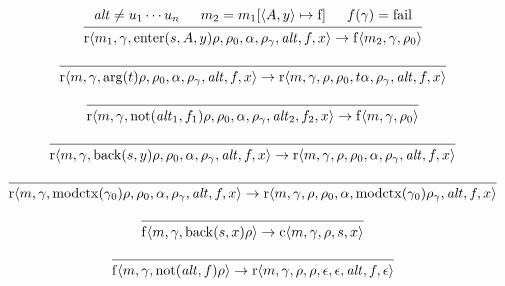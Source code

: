 \documentclass[12pt]{article}
\begin{document}
\[
  \begin{prooftree}
    \hypo{\mathit{alt} \neq u_1 \cdots u_n}
    \hypo{m_2 = m_1[\langle A, y\rangle \mapsto \mathrm{f}]}
    \hypo{f(\gamma) = \mathrm{fail}}
    \infer3{\mathrm{r}\langle m_1, \gamma, \mathrm{enter}(s, A, y) \rho, \rho_0, \alpha, \rho_\gamma, \mathit{alt}, f, x\rangle \to \mathrm{f}\langle m_2, \gamma, \rho_0\rangle}
  \end{prooftree}
\]

\[
  \begin{prooftree}
    \infer0{\mathrm{r}\langle m, \gamma, \mathrm{arg}(t) \rho, \rho_0, \alpha, \rho_\gamma, \mathit{alt}, f, x\rangle \to \mathrm{r}\langle m, \gamma, \rho, \rho_0, t \alpha, \rho_\gamma, \mathit{alt}, f, x\rangle}
  \end{prooftree}
\]

\[
  \begin{prooftree}
    \infer0{\mathrm{r}\langle m, \gamma, \mathrm{not}(\mathit{alt}_1, f_1) \rho, \rho_0, \alpha, \rho_\gamma, \mathit{alt}_2, f_2, x\rangle \to \mathrm{f}\langle m, \gamma, \rho_0\rangle}
  \end{prooftree}
\]

\[
  \begin{prooftree}
    \infer0{\mathrm{r}\langle m, \gamma, \mathrm{back}(s, y) \rho, \rho_0, \alpha, \rho_\gamma, \mathit{alt}, f, x\rangle \to \mathrm{r}\langle m, \gamma, \rho, \rho_0, \alpha, \rho_\gamma, \mathit{alt}, f, x\rangle}
  \end{prooftree}
\]

\[
  \begin{prooftree}
    \infer0{\mathrm{r}\langle m, \gamma, \mathrm{modctx}(\gamma_0) \rho, \rho_0, \alpha, \rho_\gamma, \mathit{alt}, f, x\rangle \to \mathrm{r}\langle m, \gamma, \rho, \rho_0, \alpha, \mathrm{modctx}(\gamma_0) \rho_\gamma, \mathit{alt}, f, x\rangle}
  \end{prooftree}
\]

\[
  \begin{prooftree}
    \infer0{\mathrm{f}\langle m, \gamma, \mathrm{back}(s, x) \rho\rangle \to \mathrm{c}\langle m, \gamma, \rho, s, x\rangle}
  \end{prooftree}
\]

\[
  \begin{prooftree}
    \infer0{\mathrm{f}\langle m, \gamma, \mathrm{not}(\mathit{alt}, f) \rho\rangle \to \mathrm{r}\langle m, \gamma, \rho, \rho, \epsilon, \epsilon, \mathit{alt}, f, \epsilon\rangle}
  \end{prooftree}
\]
\end{document}
